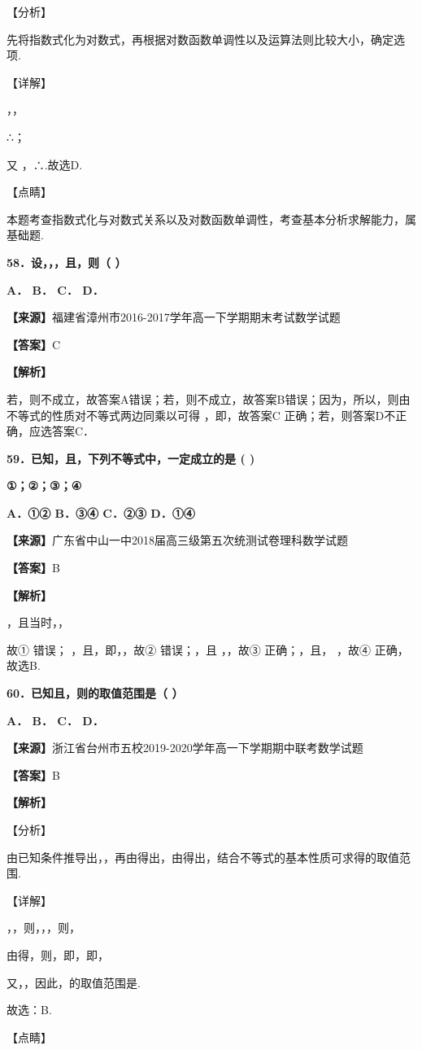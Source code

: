 【分析】

先将指数式化为对数式，再根据对数函数单调性以及运算法则比较大小，确定选项.

【详解】

，，

∴；

又 ，∴.故选D.

【点睛】

本题考查指数式化与对数式关系以及对数函数单调性，考查基本分析求解能力，属基础题.

\textbf{58．设，，，且，则（ ）}

\textbf{A． B． C． D．}

\textbf{【来源】}福建省漳州市2016-2017学年高一下学期期末考试数学试题

\textbf{【答案】}C

\textbf{【解析】}

若，则不成立，故答案A错误；若，则不成立，故答案B错误；因为，所以，则由不等式的性质对不等式两边同乘以可得
，即，故答案C 正确；若，则答案D不正确，应选答案C．

\textbf{59．已知，且，下列不等式中，一定成立的是 ( )}

\textbf{①；②；③；④}

\textbf{A．①② B．③④ C．②③ D．①④}

\textbf{【来源】}广东省中山一中2018届高三级第五次统测试卷理科数学试题

\textbf{【答案】}B

\textbf{【解析】}

，且当时，，

故① 错误； ，且，即，，故② 错误；，且 ，，故③ 正确；，且， ，故④
正确，故选B.

\textbf{60．已知且，则的取值范围是（ ）}

\textbf{A． B． C． D．}

\textbf{【来源】}浙江省台州市五校2019-2020学年高一下学期期中联考数学试题

\textbf{【答案】}B

\textbf{【解析】}

【分析】

由已知条件推导出，，再由得出，由得出，结合不等式的基本性质可求得的取值范围.

【详解】

，，则，，，则，

由得，则，即，即，

又，，因此，的取值范围是.

故选：B.

【点睛】

